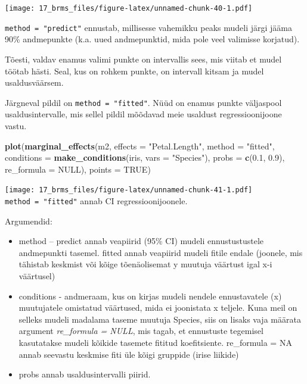 \documentclass[]{book}
\newenvironment{Shaded}{\begin{snugshade}}{\end{snugshade}}
\newcommand{\DataTypeTok}[1]{\textcolor[rgb]{0.13,0.29,0.53}{#1}}
\newcommand{\FloatTok}[1]{\textcolor[rgb]{0.00,0.00,0.81}{#1}}
\newcommand{\KeywordTok}[1]{\textcolor[rgb]{0.13,0.29,0.53}{\textbf{#1}}}
\newcommand{\NormalTok}[1]{#1}
\newcommand{\OtherTok}[1]{\textcolor[rgb]{0.56,0.35,0.01}{#1}}
\newcommand{\StringTok}[1]{\textcolor[rgb]{0.31,0.60,0.02}{#1}}
\begin{document}
\texttt{[image: 17\_brms\_files/figure-latex/unnamed-chunk-40-1.pdf]}

\texttt{method\ =\ "predict"} ennustab, millisesse vahemikku peaks mudeli järgi jääma 90\% andmepunkte (k.a. uued andmepunktid, mida pole veel valimisse korjatud).

Tõesti, valdav enamus valimi punkte on intervallis sees, mis viitab et mudel töötab hästi. Seal, kus on rohkem punkte, on intervall kitsam ja mudel usaldusväärsem.

Järgneval pildil on \texttt{method\ =\ "fitted"}. Nüüd on enamus punkte väljaspool usaldusintervalle, mis sellel pildil mõõdavad meie usaldust regressioonijoone vastu.

\begin{Shaded}
\begin{Highlighting}[]
\KeywordTok{plot}\NormalTok{(}\KeywordTok{marginal_effects}\NormalTok{(m2, }\DataTypeTok{effects =} \StringTok{"Petal.Length"}\NormalTok{, }\DataTypeTok{method =} \StringTok{"fitted"}\NormalTok{, }\DataTypeTok{conditions =} \KeywordTok{make_conditions}\NormalTok{(iris, }\DataTypeTok{vars =} \StringTok{"Species"}\NormalTok{), }\DataTypeTok{probs =} \KeywordTok{c}\NormalTok{(}\FloatTok{0.1}\NormalTok{, }\FloatTok{0.9}\NormalTok{), }\DataTypeTok{re_formula =} \OtherTok{NULL}\NormalTok{), }\DataTypeTok{points =} \OtherTok{TRUE}\NormalTok{)}
\end{Highlighting}
\end{Shaded}

\texttt{[image: 17\_brms\_files/figure-latex/unnamed-chunk-41-1.pdf]}
\texttt{method\ =\ "fitted"} annab CI regressioonijoonele.

Argumendid:

\begin{itemize}
\item
  method -- predict annab veapiirid (95\% CI) mudeli ennustustustele andmepunkti tasemel. fitted annab veapiirid mudeli fitile endale (joonele, mis tähistab keskmist või kõige tõenäolisemat y muutuja väärtust igal x-i väärtusel)
\item
  conditions - andmeraam, kus on kirjas mudeli nendele ennustavatele (x) muutujatele omistatud väärtused, mida ei joonistata x teljele. Kuna meil on selleks mudeli madalama taseme muutuja Species, siis on lisaks vaja määrata argument \emph{re\_formula = NULL}, mis tagab, et ennustuste tegemisel kasutatakse mudeli kõikide tasemete fititud koefitsiente. re\_formula = NA annab seevastu keskmise fiti üle kõigi gruppide (irise liikide)
\item
  probs annab usaldusintervalli piirid.
\end{itemize}
\end{document}
